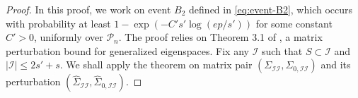\documentclass[11pt]{article}
\newcommand{\cI}{{\mathcal{I}}}
\newcommand{\0}{{\mathbf{0}}}
\begin{document}
\begin{proof}
In this proof, we work on event $B_2$ defined in \eqref{eq:event-B2}, which occurs with probability at least $1-\exp(-C's'\log(ep/s'))$ for some constant $C'>0$, uniformly over $\mathcal{P}_n$.
The proof relies on Theorem 3.1 of \cite{sun1983perturbation}, 
a matrix perturbation bound for generalized eigenspaces. 
{Fix any $\cI$ such that $S\subset \cI$ and $|\cI|\leq 2s'+s$}. 
We shall apply the theorem on matrix pair $(\Sigma_{\cI\cI},\Sigma_{0,\cI\cI})$ and its perturbation $(\widehat{\Sigma}_{\cI\cI},\widehat{\Sigma}_{0,\cI\cI})$. 


\end{proof}
\end{document}
